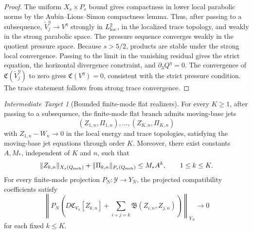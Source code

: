 \documentclass[11pt]{article}
\numberwithin{equation}{section}
\theoremstyle{plain}
\theoremstyle{definition}
\theoremstyle{remark}
\newtheorem{target}{Intermediate Target}[section]
\newcommand{\calB}{\mathfrak B}
\newcommand{\calC}{\mathfrak C}
\newcommand{\calY}{\mathcal Y}
\begin{document}
\begin{proof}
The uniform \(X_s\times P_s\) bound gives compactness in lower local parabolic norms by the
Aubin--Lions--Simon compactness lemma.  Thus, after passing to a subsequence,
\(\widetilde V_j^\eta\to V^\eta\) strongly in \(L^2_{\rm loc}\), in the localized trace topology, and
weakly in the strong parabolic space.  The pressure sequence converges weakly in the quotient
pressure space.  Because \(s>5/2\), products are stable under the strong local convergence.  Passing
to the limit in the vanishing residual gives the strict equation, the horizontal divergence constraint,
and \(\partial_3Q^\eta=0\).  The convergence of \(\calC(\widetilde V_j^\eta)\) to zero gives
\(\calC(V^\eta)=0\), consistent with the strict pressure condition.  The trace statement follows
from strong trace convergence.
\end{proof}

\begin{target}[Bounded finite-mode flat realizers]
\label{pIII:ass:bounded-finite-mode-flat-realizers}
For every \(K\ge1\), after passing to a subsequence, the finite-mode flat branch admits moving-base
jets
\[
        (Z_{1,n},\Pi_{1,n}),\ldots,(Z_{K,n},\Pi_{K,n})
\]
with \(Z_{1,n}-W_n\to0\) in the local energy and trace topologies, satisfying the moving-base jet
equations through order \(K\).  Moreover, there exist constants \(A,M_*\), independent of \(K\) and
\(n\), such that
\[
        \|Z_{k,n}\|_{X_s(Q_{\rm msh})}
        +
        \|\Pi_{k,n}\|_{P_s(Q_{\rm msh})}
        \le
        M_*A^k,
        \qquad
        1\le k\le K.
\]
For every finite-mode projection \(P_N:\calY\to Y_N\), the projected compatibility coefficients
satisfy
\[
        \left\|
        P_N
        \left(
        D\calC_{V_n}[Z_{k,n}]
        +
        \sum_{i+j=k}\calB(Z_{i,n},Z_{j,n})
        \right)
        \right\|_{Y_N}
        \to0
\]
for each fixed \(k\le K\).
\end{target}
\end{document}
